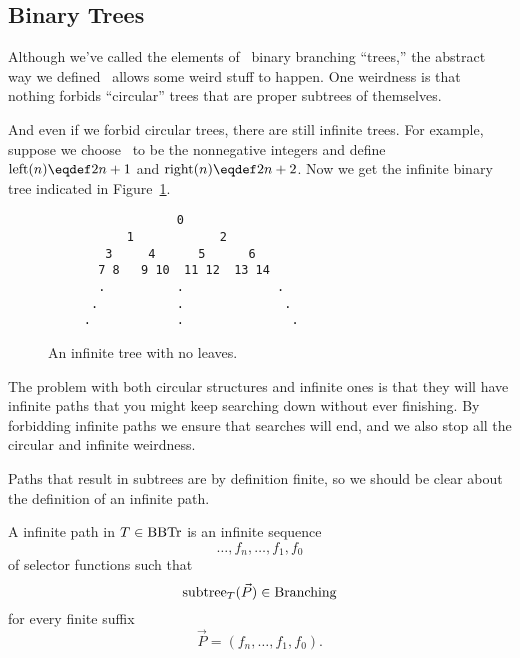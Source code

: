 \subsection{Binary Trees}
Although we've called the elements of \brnch\ binary branching
``trees,'' the abstract way we defined \brnch\ allows some weird stuff
to happen.  One weirdness is that nothing forbids ``circular'' trees
that are proper subtrees of themselves.
\iffalse
For example, it is entirely
possible that there is a structure $T \in \brnch$ such that
\textcolor{red}{
\[
\leftsub{(T)} = T = \rightsub{(T)}.
\]}

This weird binary branching structure doesn't even have any leaves.
\fi
And even if we forbid circular trees, there are still infinite
trees.  For example, suppose we choose \brnch\ to be the nonnegative
integers and define $\leftsub{(n)} \eqdef 2n+1$ and $\rightsub{(n)} \eqdef
2n+2$.  Now we get the infinite binary tree indicated in
Figure~\ref{inftree123}.


\begin{figure}


\begin{verbatim}
                  0
           1            2
        3     4      5      6
       7 8   9 10  11 12  13 14
       .          .             . 
      .           .              .
     .            .               . 

\end{verbatim}

\caption{An infinite tree with no leaves.}

\label{inftree123}

\end{figure}

The problem with both circular structures and infinite ones is that
they will have infinite paths that you might keep searching down
without ever finishing.  By forbidding infinite paths we ensure that
searches will end, and we also stop all the circular and infinite
weirdness.

Paths that result in subtrees are by definition finite, so we should
be clear about the definition of an infinite path.

\begin{definition}
A infinite path in $T \in \brnch$ is an infinite sequence
\[
\dots,f_n,\dots,f_1,f_0
\]
of selector functions such that
\[
\text{subtree}_{T}(\vec{P}) \in \text{Branching}
\]
for every finite suffix
\[
\vec{P} = (f_n,\dots, f_1,f_0).
\]
\end{definition}

